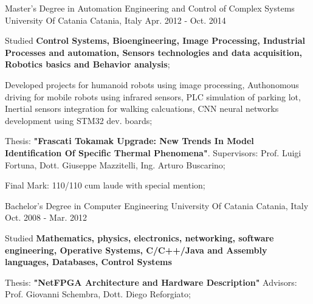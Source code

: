 

\begin{cventries}

  \cventry
    {Master’s Degree in Automation Engineering and Control of
    Complex Systems} %
    {University Of Catania} %
    {Catania, Italy} %
    {Apr. 2012 - Oct. 2014} %
    {
      \begin{cvitems} %
              \item {Studied \textbf{Control Systems, Bioengineering, Image Processing, Industrial Processes and automation, Sensors technologies and data acquisition,
              Robotics basics and Behavior analysis};}
              \item {Developed projects for humanoid robots using image processing, Authonomous driving for mobile robots using infrared sensors,
              PLC simulation of parking lot, Inertial sensors integration for walking calcuations, CNN neural networks development using STM32 dev. boards;}
              \item {Thesis: \textbf{"Frascati Tokamak Upgrade: New Trends In Model Identification
              Of Specific Thermal Phenomena"}. Supervisors: Prof. Luigi Fortuna, Dott. Giuseppe Mazzitelli, Ing. Arturo
              Buscarino;}
              \item {Final Mark: 110/110 cum laude with special mention;}
      \end{cvitems}
    }

    \cventry
    {Bachelor's Degree in Computer Engineering} %
    {University Of Catania} %
    {Catania, Italy} %
    {Oct. 2008 - Mar. 2012} %
    {
      \begin{cvitems} %
              \item {Studied \textbf{Mathematics, physics, electronics, networking, software engineering, Operative Systems, C/C++/Java and Assembly
              languages, Databases, Control Systems}}
              \item {Thesis: \textbf{"NetFPGA Architecture and Hardware Description"}
              Advisors: Prof. Giovanni Schembra, Dott. Diego Reforgiato;}
      \end{cvitems}
    }


\end{cventries}
